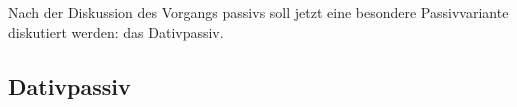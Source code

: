 



Nach der Diskussion des Vorgangs%
passivs soll jetzt eine besondere
Passivvariante diskutiert werden: das Dativpassiv.



\subsection{Dativpassiv}
\label{sec:dat-pass}

